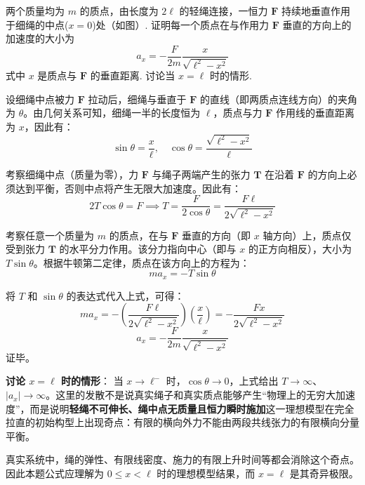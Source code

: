 \begin{exercise}\label{ex:3.1}
两个质量均为 $m$ 的质点，由长度为 $2\ell$ 的轻绳连接，一恒力 $\boldsymbol{F}$ 持续地垂直作用于细绳的中点($x=0$)处（如图）. 证明每一个质点在与作用力 $\boldsymbol{F}$ 垂直的方向上的加速度的大小为
$$a_x = - \frac{F}{2m} \frac{x}{\sqrt{\ell^2 - x^2}}$$
式中 $x$ 是质点与 $\boldsymbol{F}$ 的垂直距离. 讨论当 $x=\ell$ 时的情形.
\begin{center}
\end{center}
\end{exercise}
\begin{solution}
设细绳中点被力 $\boldsymbol{F}$ 拉动后，细绳与垂直于 $\boldsymbol{F}$ 的直线（即两质点连线方向）的夹角为 $\theta$。由几何关系可知，细绳一半的长度恒为 $\ell$，质点与力 $\boldsymbol{F}$ 作用线的垂直距离为 $x$，因此有：
$$ \sin\theta = \frac{x}{\ell}, \quad \cos\theta = \frac{\sqrt{\ell^2 - x^2}}{\ell} $$

考察细绳中点（质量为零），力 $\boldsymbol{F}$ 与绳子两端产生的张力 $\boldsymbol{T}$ 在沿着 $\boldsymbol{F}$ 的方向上必须达到平衡，否则中点将产生无限大加速度。因此有：
$$ 2T \cos\theta = F \implies T = \frac{F}{2\cos\theta} = \frac{F\ell}{2\sqrt{\ell^2 - x^2}} $$

考察任意一个质量为 $m$ 的质点，在与 $\boldsymbol{F}$ 垂直的方向（即 $x$ 轴方向）上，质点仅受到张力 $\boldsymbol{T}$ 的水平分力作用。该分力指向中心（即与 $x$ 的正方向相反），大小为 $T\sin\theta$。根据牛顿第二定律，质点在该方向上的方程为：
$$ m a_x = - T \sin\theta $$

将 $T$ 和 $\sin\theta$ 的表达式代入上式，可得：
$$ m a_x = - \left( \frac{F\ell}{2\sqrt{\ell^2 - x^2}} \right) \left( \frac{x}{\ell} \right) = - \frac{F x}{2\sqrt{\ell^2 - x^2}} $$
$$ a_x = - \frac{F}{2m} \frac{x}{\sqrt{\ell^2 - x^2}} $$
证毕。

\textbf{讨论 $x = \ell$ 时的情形}：
当 $x\to\ell^{-}$ 时，$\cos\theta\to0$，上式给出 $T\to\infty$、$|a_x|\to\infty$。这里的发散不是说真实绳子和真实质点能够产生“物理上的无穷大加速度”，而是说明\textbf{轻绳不可伸长、绳中点无质量且恒力瞬时施加}这一理想模型在完全拉直的初始构型上出现奇点：有限的横向外力不能由两段共线张力的有限横向分量平衡。

真实系统中，绳的弹性、有限线密度、施力的有限上升时间等都会消除这个奇点。因此本题公式应理解为 $0\le x<\ell$ 时的理想模型结果，而 $x=\ell$ 是其奇异极限。
\end{solution}

